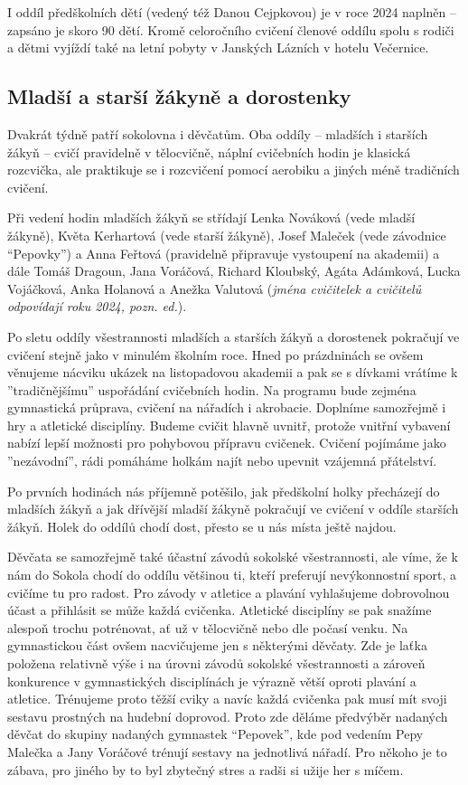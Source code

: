 I oddíl předškolních dětí (vedený též Danou Cejpkovou) je v roce 2024
naplněn -- zapsáno je skoro 90 dětí. Kromě celoročního cvičení členové
oddílu spolu s rodiči a dětmi vyjíždí také na letní pobyty v Janských
Lázních v hotelu Večernice.

\subsection{Mladší a starší žákyně a
dorostenky}\label{mladux161uxed-a-starux161uxed-ux17euxe1kynux11b-a-dorostenky}

Dvakrát týdně patří sokolovna i děvčatům. Oba oddíly -- mladších i
starších žákyň -- cvičí pravidelně v tělocvičně, náplní cvičebních hodin
je klasická rozcvička, ale praktikuje se i rozcvičení pomocí aerobiku a
jiných méně tradičních cvičení.

Při vedení hodin mladších žákyň se střídají Lenka Nováková (vede mladší
žákyně), Květa Kerhartová (vede starší žákyně), Josef Maleček (vede
závodnice ``Pepovky'') a Anna Feřtová (pravidelně připravuje vystoupení
na akademii) a dále Tomáš Dragoun, Jana Voráčová, Richard Kloubský,
Agáta Adámková, Lucka Vojáčková, Anka Holanová a Anežka Valutová
(\emph{jména cvičitelek a cvičitelů odpovídají roku 2024, pozn. ed.}).

Po sletu oddíly všestrannosti mladších a starších žákyň a dorostenek
pokračují ve cvičení stejně jako v minulém školním roce. Hned po
prázdninách se ovšem věnujeme nácviku ukázek na listopadovou akademii a
pak se s dívkami vrátíme k ''tradičnějšímu'' uspořádání cvičebních
hodin. Na programu bude zejména gymnastická průprava, cvičení na
nářadích i akrobacie. Doplníme samozřejmě i hry a atletické disciplíny.
Budeme cvičit hlavně uvnitř, protože vnitřní vybavení nabízí lepší
možnosti pro pohybovou přípravu cvičenek. Cvičení pojímáme jako
''nezávodní'', rádi pomáháme holkám najít nebo upevnit vzájemná
přátelství.

Po prvních hodinách nás příjemně potěšilo, jak předškolní holky
přecházejí do mladších žákyň a jak dřívější mladší žákyně pokračují ve
cvičení v oddíle starších žákyň. Holek do oddílů chodí dost, přesto se u
nás místa ještě najdou.

Děvčata se samozřejmě také účastní závodů sokolské všestrannosti, ale
víme, že k nám do Sokola chodí do oddílu většinou ti, kteří preferují
nevýkonnostní sport, a cvičíme tu pro radost. Pro závody v atletice a
plavání vyhlašujeme dobrovolnou účast a přihlásit se může každá
cvičenka. Atletické disciplíny se pak snažíme alespoň trochu potrénovat,
ať už v tělocvičně nebo dle počasí venku. Na gymnastickou část ovšem
nacvičujeme jen s některými děvčaty. Zde je laťka položena relativně
výše i na úrovni závodů sokolské všestrannosti a zároveň konkurence v
gymnastických disciplínách je výrazně větší oproti plavání a atletice.
Trénujeme proto těžší cviky a navíc každá cvičenka pak musí mít svoji
sestavu prostných na hudební doprovod. Proto zde děláme předvýběr
nadaných děvčat do skupiny nadaných gymnastek ``Pepovek'', kde pod
vedením Pepy Malečka a Jany Voráčové trénují sestavy na jednotlivá
nářadí. Pro někoho je to zábava, pro jiného by to byl zbytečný stres a
radši si užije her s míčem.

